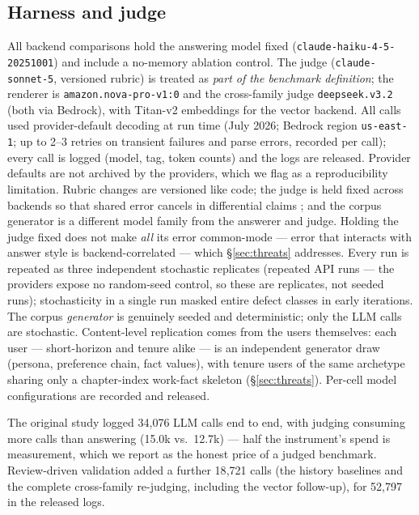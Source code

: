 \subsection{Harness and judge}
\label{sec:harness}

All backend comparisons hold the answering model fixed
(\texttt{claude-haiku-4-5-20251001}) and include a no-memory ablation
control. The judge (\texttt{claude-sonnet-5}, versioned rubric) is treated
as \emph{part of the benchmark definition}; the renderer is
\texttt{amazon.nova-pro-v1:0} and the cross-family judge
\texttt{deepseek.v3.2} (both via Bedrock), with Titan-v2 embeddings for the
vector backend. All calls used provider-default decoding at run time
(July 2026; Bedrock region \texttt{us-east-1}; up to 2--3 retries on
transient failures and parse errors, recorded per call); every call is
logged (model, tag, token counts) and the logs are released. Provider
defaults are not archived by the providers, which we flag as a
reproducibility limitation. Rubric changes are versioned like code; the
judge is held fixed across backends so that shared error cancels in
differential claims \citep{zheng2023judging,wang2024notfair}; and the
corpus generator is a different model family from the answerer and judge.
Holding the judge fixed does not make \emph{all} its error common-mode ---
error that interacts with answer style is backend-correlated --- which
\S\ref{sec:threats} addresses. Every run is repeated as three independent
stochastic replicates (repeated API runs --- the providers expose no
random-seed control, so these are replicates, not seeded runs);
stochasticity in a single run masked entire defect classes in early
iterations. The corpus \emph{generator} is genuinely seeded and
deterministic; only the LLM calls are stochastic. Content-level
replication comes
from the users themselves: each user --- short-horizon and tenure alike ---
is an independent generator draw (persona, preference chain, fact values),
with tenure users of the same archetype sharing only a chapter-index
work-fact skeleton (\S\ref{sec:threats}). Per-cell model configurations are
recorded and released.

The original study logged 34{,}076 LLM calls end to end, with judging
consuming more calls than answering (15.0k vs.\ 12.7k) --- half the
instrument's spend is measurement, which we report as the honest price of
a judged benchmark. Review-driven validation added a further 18{,}721
calls (the history baselines and the complete cross-family re-judging,
including the vector follow-up), for 52{,}797 in the released logs.

